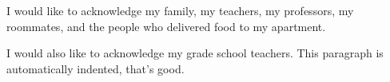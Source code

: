 I would like to acknowledge my family, my teachers, my professors, my roommates, and the people who delivered food to my apartment.

I would also like to acknowledge my grade school teachers.
This paragraph is automatically indented, that's good.


